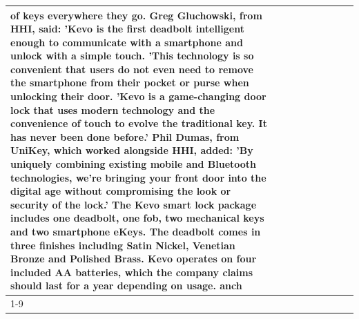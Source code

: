 \begin{table}[H]
\begin{tabular}{lllrlllll}
of keys everywhere they go. Greg Gluchowski, from HHI, said: 'Kevo is the first deadbolt intelligent enough to communicate with a smartphone and unlock with a simple touch. 'This technology is so convenient that users do not even need to remove the smartphone from their pocket or purse when unlocking their door. 'Kevo is a game-changing door lock that uses modern technology and the convenience of touch to evolve the traditional key. It has never been done before.' Phil Dumas, from UniKey, which worked alongside HHI, added: 'By uniquely combining existing mobile and Bluetooth technologies, we’re bringing your front door into the digital age without compromising the look or security of the lock.' The Kevo smart lock package includes one deadbolt, one fob, two mechanical keys and two smartphone eKeys. The deadbolt comes in three finishes including Satin Nickel, Venetian Bronze and Polished Brass. Kevo operates on four included AA batteries, which the company claims should last for a year depending on usage. anch \\
\cline{1-9}

\end{tabular}
\end{table}

